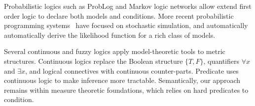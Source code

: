 Probabilistic logics such as ProbLog \cite{richardson2006markov} and Markov logic networks \cite{de2007problog} allow extend first order logic to declare both models and conditions.
More recent probabilistic programming systems~\citep{milch20071, wood2014new,mansinghka2014venture,goodman2008church,carpenter2017stan} have focused on stochastic simulation, and automatically automatically derive the likelihood function for a rich class of models.



Several continuous \cite{levin2000continuous} and fuzzy \cite{klir1995fuzzy} logics apply model-theoretic tools to metric structures.
Continuous logics replace the Boolean structure $\{T, F\}$, quantifiers $\forall x$ and $\exists x$, and logical connectives with continuous counter-parts.
Predicate uses continuous logic to make inference more tractable. Semantically, our approach remains within measure theoretic foundations, which relies on hard predicates to condition.



